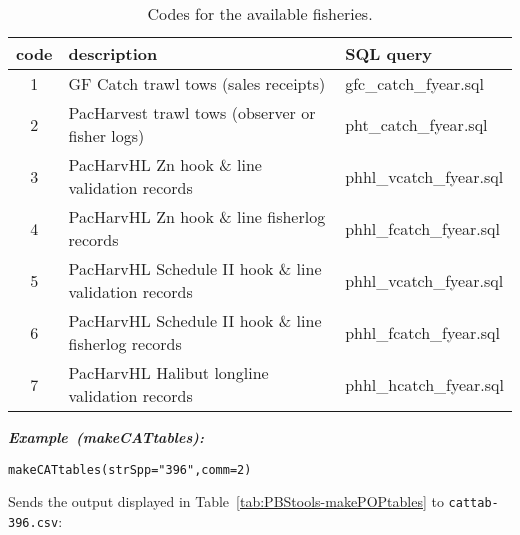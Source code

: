 \documentclass[letterpaper,12pt,fleqn]{article}
\newcommand\tstrut{\rule{0pt}{2.4ex}}         %
\newcommand\bstrut{\rule[-1.0ex]{0pt}{0pt}}   %
\newcommand{\code}[1]{\small\texttt{#1}\normalsize}
\newcommand\example[1]{    %
	\textbf{\emph{Example~(#1):}}\\ \vspace{3 pt}
}
\begin{document}
\begin{table}[ht!]
  \caption{Codes for the available fisheries.}
  \begin{center}
    \begin{tabular}{cll}
    \hline 
    code & description & SQL query  \tstrut \bstrut \\
    \hline
    1 & GF Catch trawl tows (sales receipts)                 & gfc\_catch\_fyear.sql \tstrut \\
    2 & PacHarvest trawl tows (observer or fisher logs)      & pht\_catch\_fyear.sql \\
    3 & PacHarvHL Zn hook \& line validation records          & phhl\_vcatch\_fyear.sql \\
    4 & PacHarvHL Zn hook \& line fisherlog records           & phhl\_fcatch\_fyear.sql \\
    5 & PacHarvHL Schedule II hook \& line validation records & phhl\_vcatch\_fyear.sql \\
    6 & PacHarvHL Schedule II hook \& line fisherlog records  & phhl\_fcatch\_fyear.sql \\
    7 & PacHarvHL Halibut longline validation records        & phhl\_hcatch\_fyear.sql \bstrut \\
    \hline 
    \end{tabular}
  \end{center}
  \label{tab:PBStools-makeCATtables}
\end{table}

\begin{examplebox}
\example{makeCATtables}
\begin{Verbatim}[fontsize=\footnotesize]
makeCATtables(strSpp="396",comm=2)
\end{Verbatim}
\end{examplebox}

Sends the output displayed in Table~\ref{tab:PBStools-makePOPtables} to \code{cattab-396.csv}:
\end{document}
